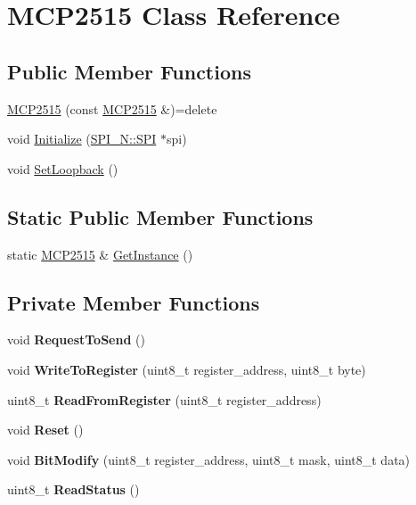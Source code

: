 \hypertarget{class_m_c_p2515}{}\section{M\+C\+P2515 Class Reference}
\label{class_m_c_p2515}
\subsection*{Public Member Functions}
\begin{DoxyCompactItemize}
\item 
\hyperlink{class_m_c_p2515_a8cd4111604b740feb758bd4d077f4fb8}{M\+C\+P2515} (const \hyperlink{class_m_c_p2515}{M\+C\+P2515} \&)=delete
\item 
void \hyperlink{class_m_c_p2515_a41921933b4f2595e8935f8432dd8d65b}{Initialize} (\hyperlink{class_s_p_i___n_1_1_s_p_i}{S\+P\+I\+\_\+\+N\+::\+S\+PI} $\ast$spi)
\item 
void \hyperlink{class_m_c_p2515_a7aac5fdb713b83933391348f1188f2b9}{Set\+Loopback} ()
\end{DoxyCompactItemize}
\subsection*{Static Public Member Functions}
\begin{DoxyCompactItemize}
\item 
static \hyperlink{class_m_c_p2515}{M\+C\+P2515} \& \hyperlink{class_m_c_p2515_a3f53839a9258086fd21e2fc4190de60d}{Get\+Instance} ()
\end{DoxyCompactItemize}
\subsection*{Private Member Functions}
\begin{DoxyCompactItemize}
\item 
\hypertarget{class_m_c_p2515_a5a218199ca1dfcb25cb95890bc0220fc}{}\label{class_m_c_p2515_a5a218199ca1dfcb25cb95890bc0220fc} 
void {\bfseries Request\+To\+Send} ()
\item 
\hypertarget{class_m_c_p2515_adbc005a5975b77b0aef74363f3832f9b}{}\label{class_m_c_p2515_adbc005a5975b77b0aef74363f3832f9b} 
void {\bfseries Write\+To\+Register} (uint8\+\_\+t register\+\_\+address, uint8\+\_\+t byte)
\item 
\hypertarget{class_m_c_p2515_aafa4540f951a661dd68aa128baf5ee6b}{}\label{class_m_c_p2515_aafa4540f951a661dd68aa128baf5ee6b} 
uint8\+\_\+t {\bfseries Read\+From\+Register} (uint8\+\_\+t register\+\_\+address)
\item 
\hypertarget{class_m_c_p2515_aa4d4138b984dc87116cf72ae104acb70}{}\label{class_m_c_p2515_aa4d4138b984dc87116cf72ae104acb70} 
void {\bfseries Reset} ()
\item 
\hypertarget{class_m_c_p2515_aa9a35fe139adf1fccaaceec561544c14}{}\label{class_m_c_p2515_aa9a35fe139adf1fccaaceec561544c14} 
void {\bfseries Bit\+Modify} (uint8\+\_\+t register\+\_\+address, uint8\+\_\+t mask, uint8\+\_\+t data)
\item 
\hypertarget{class_m_c_p2515_a966931bda84094f18672039cc8e06e18}{}\label{class_m_c_p2515_a966931bda84094f18672039cc8e06e18} 
uint8\+\_\+t {\bfseries Read\+Status} ()
\end{DoxyCompactItemize}
